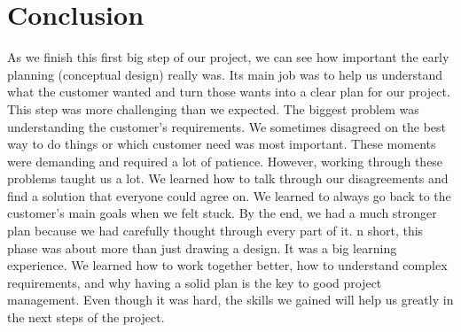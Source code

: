 \documentclass[a4paper,12pt]{article}
\begin{document}
\section{Conclusion}
 As we finish this first big step of our project, we can see how important the early planning (conceptual design) really was. Its main job was to help us understand what the customer wanted and turn those wants into a clear plan for our project.
This step was more challenging than we expected. The biggest problem was understanding the customer's requirements. We sometimes disagreed on the best way to do things or which customer need was most important. These moments were demanding and required a lot of patience.
However, working through these problems taught us a lot. We learned how to talk through our disagreements and find a solution that everyone could agree on. We learned to always go back to the customer's main goals when we felt stuck. By the end, we had a much stronger plan because we had carefully thought through every part of it.
n short, this phase was about more than just drawing a design. It was a big learning experience. We learned how to work together better, how to understand complex requirements, and why having a solid plan is the key to good project management. Even though it was hard, the skills we gained will help us greatly in the next steps of the project.
\end{document}

